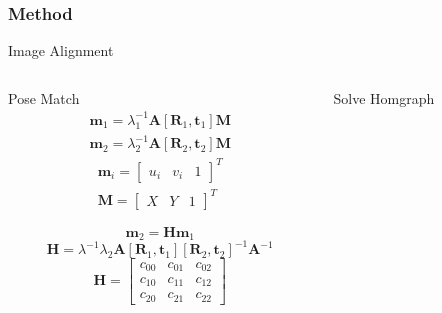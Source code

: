 \documentclass[14pt,hyperref={CJKbookmarks=true}]{beamer}
\theoremstyle{plain}
\theoremstyle{definition}
\theoremstyle{remark}
\begin{document}
\begin{frame}
\frametitle{Method}{Image Alignment}
\begin{columns}[onlytextwidth]
\begin{column}{0.4\textwidth}
\begin{block}{Pose Match}
\scriptsize
\begin{equation}\label{eq:eqRect}
\begin{split}
\mathbf{m}_1 = \lambda_1^{-1}\mathbf{A}[\mathbf{R}_1,\mathbf{t}_1]\mathbf{M}\\
\mathbf{m}_2 = \lambda_2^{-1}\mathbf{A}[\mathbf{R}_2,\mathbf{t}_2]\mathbf{M}
\end{split}
\end{equation}
\begin{equation}
\begin{split}
\mathbf{m}_i = \begin{bmatrix}u_i&v_i&1\end{bmatrix}^T\\
\mathbf{M}=\begin{bmatrix}X&Y&1\end{bmatrix}^T
\end{split}
\end{equation}

\begin{equation}\label{eq:RectHomo}
  \mathbf{m}_2 = \mathbf{H}\mathbf{m}_1
\end{equation}
\begin{equation}\label{eq:GetHomo}
  \mathbf{H} = \lambda^{-1}\lambda_2\mathbf{A}[\mathbf{R}_1,\mathbf{t}_1][\mathbf{R}_2,\mathbf{t}_2]^{-1}\mathbf{A}^{-1}
\end{equation}
\begin{equation}\label{eq:ExtrinsicM}
\mathbf{H}  = \begin{bmatrix}c_{00}&c_{01}&c_{02} \\c_{10}&c_{11}&c_{12}\\ c_{20}&c_{21}&c_{22} \end{bmatrix}
\end{equation}
\end{block}
\end{column}
\begin{column}{0.5\textwidth}
\begin{block}{Solve Homgraph }

\scriptsize



\end{block}
\end{column}
\end{columns}
\end{frame}
\end{document}
